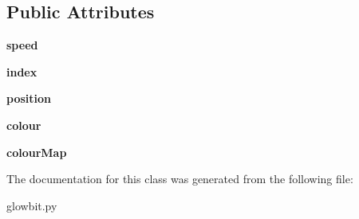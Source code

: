 \subsection*{Public Attributes}
\begin{DoxyCompactItemize}
\item 
\mbox{\label{classglowbit_1_1stick_1_1pulse_ac600e5460c9f05e36ea6d7b7cef0c763}} 
{\bfseries speed}
\item 
\mbox{\label{classglowbit_1_1stick_1_1pulse_a7b5b6ddb2b400a838fbd8ec7819a4639}} 
{\bfseries index}
\item 
\mbox{\label{classglowbit_1_1stick_1_1pulse_a0f6cfd05528b519e1ace1fc65f3e6929}} 
{\bfseries position}
\item 
\mbox{\label{classglowbit_1_1stick_1_1pulse_a1b0b4b29bc1a9bbd90d9f919589a560a}} 
{\bfseries colour}
\item 
\mbox{\label{classglowbit_1_1stick_1_1pulse_a11a715a74934bb938e8e826da29aac67}} 
{\bfseries colour\+Map}
\end{DoxyCompactItemize}


The documentation for this class was generated from the following file\+:\begin{DoxyCompactItemize}
\item 
glowbit.\+py\end{DoxyCompactItemize}
